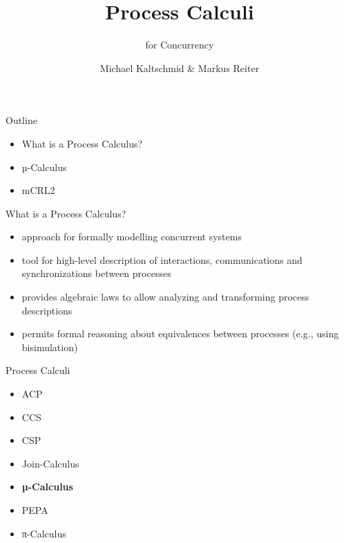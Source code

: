\documentclass[aspectratio=1610]{beamer}
\title{Process Calculi}
\subtitle{for Concurrency}
\author{Michael Kaltschmid \& Markus Reiter}
\date{}
\begin{document}
  \maketitle

  \begin{frame}{Outline}
    \begin{itemize}
      \item What is a Process Calculus?
      \item µ-Calculus
      \item mCRL2
    \end{itemize}
  \end{frame}

  \begin{frame}{What is a Process Calculus?}
    \begin{itemize}
      \item approach for formally modelling concurrent systems
      \item tool for high-level description of interactions, communications and synchronizations between processes
      \item provides algebraic laws to allow analyzing and transforming process descriptions
      \item permits formal reasoning about equivalences between processes (e.g., using bisimulation)
    \end{itemize}
  \end{frame}

  \begin{frame}{Process Calculi}
    \begin{itemize}
      \item ACP
      \item CCS
      \item CSP
      \item Join-Calculus
      \item \textbf{µ-Calculus}
      \item PEPA
      \item π-Calculus
    \end{itemize}
  \end{frame}
\end{document}

